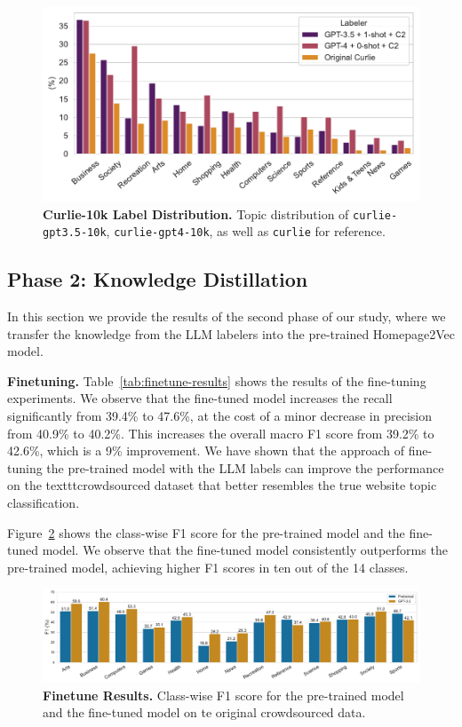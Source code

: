 \begin{figure}[!ht]
    \centering
    \includegraphics[width=.8\columnwidth]{figures/curlie-10k-dist.pdf}
    \caption{\textbf{Curlie-10k Label Distribution.} Topic distribution of \texttt{curlie-gpt3.5-10k}, \texttt{curlie-gpt4-10k}, as well as \texttt{curlie} for reference.}
    \label{fig:curlie-10k-dist}
\end{figure}


\subsection*{Phase 2: Knowledge Distillation}

In this section we provide the results of the second phase of our study, where we transfer the knowledge from the LLM labelers into the pre-trained Homepage2Vec model.

\textbf{Finetuning.} Table~\ref{tab:finetune-results} shows the results of the fine-tuning experiments. 
We observe that the fine-tuned model increases the recall significantly from 39.4\% to 47.6\%, at the cost of a minor decrease in precision from 40.9\% to 40.2\%. 
This increases the overall macro F1 score from 39.2\% to 42.6\%, which is a 9\% improvement. 
We have shown that the approach of fine-tuning the pre-trained model with the LLM labels can improve the performance on the texttt{crowdsourced} dataset that better resembles the true website topic classification.




Figure~\ref{fig:finetune-results} shows the class-wise F1 score for the pre-trained model and the fine-tuned model. We observe that the fine-tuned model consistently outperforms the pre-trained model, achieving higher F1 scores in ten out of the 14 classes.

\begin{figure}
    \centering
    \includegraphics[width=\textwidth]{./figures/exp2-mf1.pdf}
    \caption{\textbf{Finetune Results.} Class-wise F1 score for the pre-trained model and the fine-tuned model on te original crowdsourced data.}
    \label{fig:finetune-results}
\end{figure}
